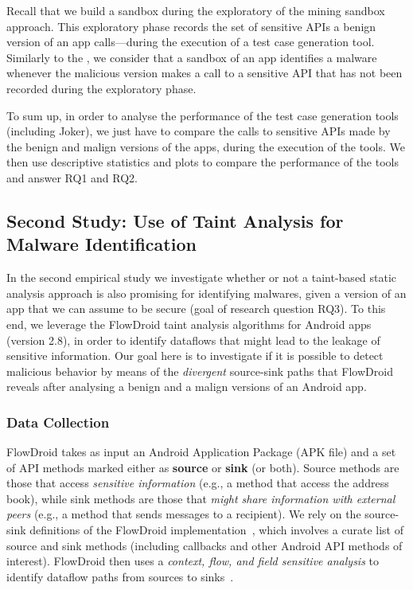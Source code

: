 Recall that we build a sandbox 
during the exploratory of the mining
sandbox approach. This exploratory
phase records the set of 
sensitive APIs a benign version of an
app calls---during the execution of a test
case generation tool. Similarly to the \blls,
we consider that a sandbox of an
app identifies a malware whenever the
malicious version makes a call to a sensitive API  
that has not been recorded during the exploratory
phase. 

To sum up, in order to analyse the
performance of the test case generation tools (including Joker),
we just have to compare the calls to sensitive APIs made by
the benign and malign versions of the apps, during
the execution of the tools. We then use descriptive statistics
and plots to compare the performance of the tools and
answer RQ1 and RQ2. 

\subsection{Second Study: Use of Taint Analysis for Malware Identification}\label{sec:set2}

In the second empirical study 
we investigate whether or not a taint-based static analysis approach is also promising for
identifying malwares, given a version of an app that we can assume to be secure (goal of research
question RQ3).
To this end, we leverage the FlowDroid
taint analysis algorithms for Android apps (version 2.8), in order to identify dataflows
that might lead to the leakage of sensitive information. Our
goal here is to investigate if it is possible to detect malicious
behavior by means of the \emph{divergent} source-sink paths that FlowDroid reveals after
analysing a benign and a malign versions of an Android app.

\subsubsection{Data Collection}

FlowDroid takes as input an Android Application Package (APK file) and
a set of API methods marked either as {\bf source}
or {\bf sink} (or both). Source methods are those that access \emph{sensitive information} (e.g.,
a method that access the address book), while sink methods are those 
that \emph{might share information with external peers} (e.g., a method that
sends messages to a recipient). We rely on the source-sink definitions
of the FlowDroid implementation~\cite{arzt:pldi-2014,rasthofer-source-sink},
which involves a curate list of source and sink methods (including callbacks and
other Android API methods of interest).
FlowDroid then uses a \emph{context, flow, and field
sensitive analysis} to identify dataflow paths from sources to sinks~\cite{arzt:pldi-2014}.

